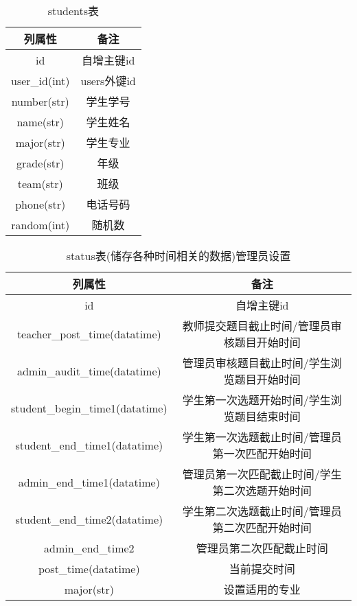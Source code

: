 \begin{table}[ht]
    \centering
    \caption{students表}
    \begin{tabular}{|c|c|}
        \hline
        列属性           & 备注        \\
        \hline
        id            & 自增主键id    \\
        \hline
        user\_id(int) & users外键id \\
        \hline
        number(str)   & 学生学号      \\
        \hline
        name(str)     & 学生姓名      \\
        \hline
        major(str)    & 学生专业      \\
        \hline
        grade(str)    & 年级        \\
        \hline
        team(str)     & 班级        \\
        \hline
        phone(str)    & 电话号码      \\
        \hline
        random(int)   & 随机数       \\
        \hline
    \end{tabular}
    
    \label{tab:students}
\end{table}

\clearpage

\begin{table}[ht]
    \centering
    \caption{status表(储存各种时间相关的数据)管理员设置}
    \begin{tabular}{|c|c|}
        \hline
        列属性                             & 备注                       \\
        \hline
        id                              & 自增主键id                   \\
        \hline
        teacher\_post\_time(datatime)   & 教师提交题目截止时间/管理员审核题目开始时间   \\
        \hline
        admin\_audit\_time(datatime)    & 管理员审核题目截止时间/学生浏览题目开始时间   \\
        \hline
        student\_begin\_time1(datatime) & 学生第一次选题开始时间/学生浏览题目结束时间   \\
        \hline
        student\_end\_time1(datatime)   & 学生第一次选题截止时间/管理员第一次匹配开始时间 \\
        \hline
        admin\_end\_time1(datatime)     & 管理员第一次匹配截止时间/学生第二次选题开始时间 \\
        \hline
        student\_end\_time2(datatime)   & 学生第二次选题截止时间/管理员第二次匹配开始时间 \\
        \hline
        admin\_end\_time2               & 管理员第二次匹配截止时间             \\
        \hline
        post\_time(datatime)            & 当前提交时间                   \\
        \hline
        major(str)                      & 设置适用的专业                  \\
        \hline
    \end{tabular}
    
    \label{tab:status}
\end{table}

